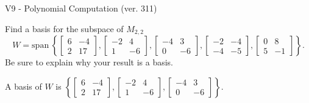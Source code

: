 \begin{exercise}
  \begin{exerciseTitle}V9 - Polynomial Computation (ver. 311)\end{exerciseTitle}
  \begin{exerciseStatement}
    Find a basis for the subspace of \(M_{2,2}\) 
\[W=\mathrm{span}\ \left\{\left[\begin{array}{cc}
6 & -4 \\
2 & 17
\end{array}\right] , \left[\begin{array}{cc}
-2 & 4 \\
1 & -6
\end{array}\right] , \left[\begin{array}{cc}
-4 & 3 \\
0 & -6
\end{array}\right] , \left[\begin{array}{cc}
-2 & -4 \\
-4 & -5
\end{array}\right] , \left[\begin{array}{cc}
0 & 8 \\
5 & -1
\end{array}\right]\right\}.\]
 Be sure to explain why your result is a basis.


  \end{exerciseStatement}
  \begin{exerciseAnswer}
   A basis of \(W\) is  \(\left\{\left[\begin{array}{cc}
6 & -4 \\
2 & 17
\end{array}\right] , \left[\begin{array}{cc}
-2 & 4 \\
1 & -6
\end{array}\right] , \left[\begin{array}{cc}
-4 & 3 \\
0 & -6
\end{array}\right]\right\}\).
  


  \end{exerciseAnswer}
\end{exercise}